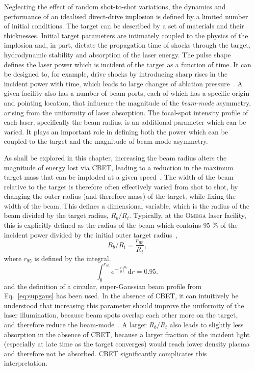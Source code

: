 Neglecting the effect of random shot-to-shot variations, the dynamics and performance of an idealised direct-drive implosion is defined by a limited number of initial conditions.
The target can be described by a set of materials and their thicknesses.
Initial target parameters are intimately coupled to the physics of the implosion and, in part, dictate the propagation time of shocks through the target, hydrodynamic stability and absorption of the laser energy.
The pulse shape defines the laser power which is incident of the target as a function of time.
It can be designed to, for example, drive shocks by introducing sharp rises in the incident power with time, which leads to large changes of ablation pressure~\cite{scott_shock-augmented_2022}.
A given facility also has a number of beam ports, each of which has a specific origin and pointing location, that influence the magnitude of the \textit{beam-mode} asymmetry, arising from the uniformity of laser absorption.
The focal-spot intensity profile of each laser, specifically the beam radius, is an additional parameter which can be varied.
It plays an important role in defining both the power which can be coupled to the target and the magnitude of beam-mode asymmetry.

As shall be explored in this chapter, increasing the beam radius alters the magnitude of energy lost via \ac{CBET}, leading to a reduction in the maximum target mass that can be imploded at a given speed~\cite{froula_increasing_2012}.
The width of the beam relative to the target is therefore often effectively varied from shot to shot, by changing the outer radius (and therefore mass) of the target, while fixing the width of the beam.
This defines a dimensional variable, which is the radius of the beam divided by the target radius, $R_b/R_t$.
Typically, at the \textsc{Omega} laser facility, this is explicitly defined as the radius of the beam which contains 95 \% of the incident power divided by the initial outer target radius~\cite{froula_increasing_2012,colaitis_exploration_2023,anderson_enhanced_2024},
\begin{equation}
    R_b/R_t = \frac{r_{95}}{R_t},
\end{equation}
where $r_{95}$ is defined by the integral,
\begin{equation}
    \label{eq:Res1_r95}
    \int_0^{r_{95}}e^{- \left| \frac{r}{\sigma} \right| ^{n_s}}\text{d}r = 0.95,
\end{equation}
and the definition of a circular, super-Gaussian beam profile from Eq.~\ref{eq:supgaus} has been used.
In the absence of \ac{CBET}, it can intuitively be understood that increasing this parameter should improve the uniformity of the laser illumination, because beam spots overlap each other more on the target, and therefore reduce the beam-mode~\cite{lees_understanding_2023}.
A larger $R_b/R_t$ also leads to slightly less absorption in the absence of \ac{CBET}, because a larger fraction of the incident light (especially at late time as the target converges) would reach lower density plasma and therefore not be absorbed.
\ac{CBET} significantly complicates this interpretation.

